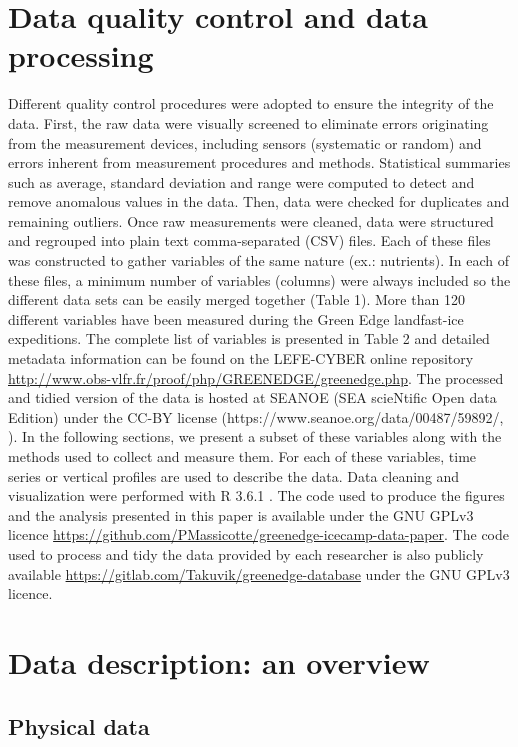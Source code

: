 \documentclass[essd, manuscript]{copernicus}
\begin{document}
\section{Data quality control and data processing}

Different quality control procedures were adopted to ensure the integrity of the data. First, the raw data were visually screened to eliminate errors originating from the measurement devices, including sensors (systematic or random) and errors inherent from measurement procedures and methods. Statistical summaries such as average, standard deviation and range were computed to detect and remove anomalous values in the data. Then, data were checked for duplicates and remaining outliers. Once raw measurements were cleaned, data were structured and regrouped into plain text comma-separated (CSV) files. Each of these files was constructed to gather variables of the same nature (ex.: nutrients). In each of these files, a minimum number of variables (columns) were always included so the different data sets can be easily merged together (Table 1). More than 120 different variables have been measured during the Green Edge landfast-ice expeditions. The complete list of variables is presented in Table 2 and detailed metadata information can be found on the LEFE-CYBER online repository \url{http://www.obs-vlfr.fr/proof/php/GREENEDGE/greenedge.php}. The processed and tidied version of the data is hosted at SEANOE (SEA scieNtific Open data Edition) under the CC-BY license (https://www.seanoe.org/data/00487/59892/, \citet{Massicotte2019b}). In the following sections, we present a subset of these variables along with the methods used to collect and measure them. For each of these variables, time series or vertical profiles are used to describe the data. Data cleaning and visualization were performed with R 3.6.1 \citep{RCoreTeam2019}. The code used to produce the figures and the analysis presented in this paper is available under the GNU GPLv3 licence \url{https://github.com/PMassicotte/greenedge-icecamp-data-paper}. The code used to process and tidy the data provided by each researcher is also publicly available \url{https://gitlab.com/Takuvik/greenedge-database} under the GNU GPLv3 licence.

\section{Data description: an overview}

\subsection{Physical data}
\end{document}
